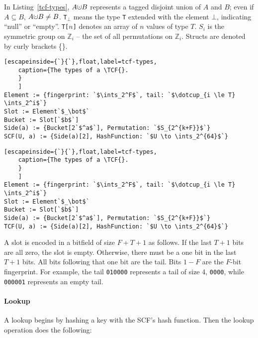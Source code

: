 \documentclass[letterpaper,twocolumn,10pt]{article}
\newcommand{\ints}{\mathbb{Z}}
\newcommand{\dotcup}{\ensuremath{\mathaccent\cdot\cup}}
\newcommand{\TCF}{SCF}
\newcommand{\TCF}{TCF}
\begin{document}
In Listing~\ref{tcf-types},       $A \dotcup B$ represents a tagged disjoint union of $A$ and $B$; even if $A \subseteq B$, $A \dotcup B \ne B$.
      \texttt{T}$_\bot$ means the type \texttt{T} extended with the element $\bot$, indicating ``null'' or ``empty''.
      \texttt{T[$n$]} denotes an array of $n$ values of type $T$.
      $S_i$ is the symmetric group on $\ints_i$ -- the set of all permutations on $\ints_i$.
      Structs are denoted by curly brackets \{\}. %

\ifanon
\begin{lstlisting}[escapeinside={`}{`},float,label=tcf-types,
    caption={The types of a \TCF{}.
    }
    ]
Element := {fingerprint: `$\ints_2^F$`, tail: `$\dotcup_{i \le T} \ints_2^i$`}
Slot := Element`$_\bot$`
Bucket := Slot[`$b$`]
Side(a) := {Bucket[2`$^a$`], Permutation: `$S_{2^{k+F}}$`}
SCF(U, a) := {Side(a)[2], HashFunction: `$U \to \ints_2^{64}$`}
\end{lstlisting}
\else
\begin{lstlisting}[escapeinside={`}{`},float,label=tcf-types,
    caption={The types of a \TCF{}.
    }
    ]
Element := {fingerprint: `$\ints_2^F$`, tail: `$\dotcup_{i \le T} \ints_2^i$`}
Slot := Element`$_\bot$`
Bucket := Slot[`$b$`]
Side(a) := {Bucket[2`$^a$`], Permutation: `$S_{2^{k+F}}$`}
TCF(U, a) := {Side(a)[2], HashFunction: `$U \to \ints_2^{64}$`}
\end{lstlisting}
\fi

A slot is encoded in a bitfield of size $F+T+1$ as follows.
If the last $T+1$ bits are all zero, the slot is empty.
Otherwise, there must be a one bit in the last $T+1$ bits.
All bits following that one bit are the tail.
Bits $1-F$ are the $F$-bit fingerprint.
For example, the tail {\tt 010000} represents a tail of size 4, {\tt 0000}, while {\tt 000001} represents an empty tail.

\paragraph{Lookup}
A lookup begins by hashing a key with the \TCF{}'s hash function. %
Then the lookup operation does the following:
\end{document}
